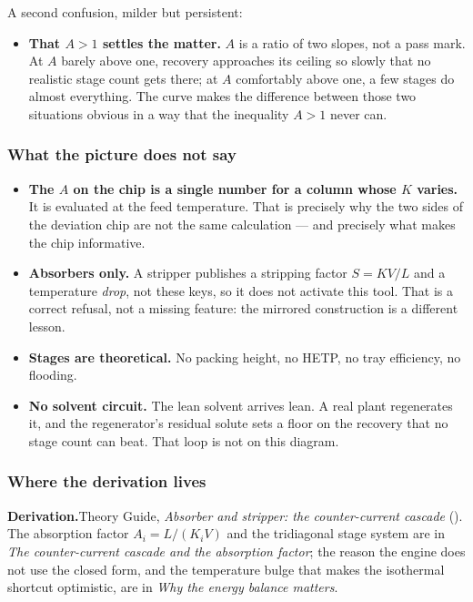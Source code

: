 \documentclass[11pt,a4paper]{article}
\newcommand{\derivation}[1]{%
  \smallskip\noindent\textbf{\sffamily\small Derivation.}\quad #1\par\smallskip}
\begin{document}
A second confusion, milder but persistent:

\begin{itemize}[leftmargin=*,nosep,topsep=4pt]
  \item \textbf{That $A > 1$ settles the matter.}  $A$ is a ratio of two
        slopes, not a pass mark.  At $A$ barely above one, recovery
        approaches its ceiling so slowly that no realistic stage count
        gets there; at $A$ comfortably above one, a few stages do almost
        everything.  The curve makes the difference between those two
        situations obvious in a way that the inequality $A > 1$ never can.
\end{itemize}

\subsubsection*{What the picture does not say}

\begin{itemize}[leftmargin=*,nosep]
  \item \textbf{The $A$ on the chip is a single number for a column whose
        $K$ varies.}  It is evaluated at the feed temperature.  That is
        precisely why the two sides of the deviation chip are not the same
        calculation --- and precisely what makes the chip informative.
  \item \textbf{Absorbers only.}  A stripper publishes a stripping factor
        $S = KV/L$ and a temperature \emph{drop}, not these keys, so it
        does not activate this tool.  That is a correct refusal, not a
        missing feature: the mirrored construction is a different lesson.
  \item \textbf{Stages are theoretical.}  No packing height, no HETP, no
        tray efficiency, no flooding.
  \item \textbf{No solvent circuit.}  The lean solvent arrives lean.  A
        real plant regenerates it, and the regenerator's residual solute
        sets a floor on the recovery that no stage count can beat.  That
        loop is not on this diagram.
\end{itemize}

\subsubsection*{Where the derivation lives}

\derivation{Theory Guide, \emph{Absorber and stripper: the counter-current
cascade} (\theorydest{ch:absorber}).  The absorption factor
$A_i = L/(K_i V)$ and the tridiagonal stage system are in \emph{The
counter-current cascade and the absorption factor}; the reason the engine
does not use the closed form, and the temperature bulge that makes the
isothermal shortcut optimistic, are in \emph{Why the energy balance
matters}.}
\end{document}
